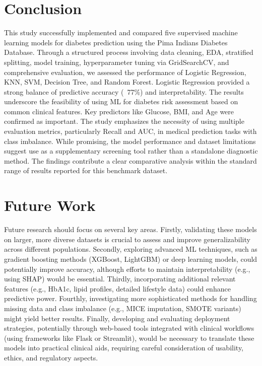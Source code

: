 \documentclass[conference]{IEEEtran}
\begin{document}
\section{Conclusion}
This study successfully implemented and compared five supervised machine learning models for diabetes prediction using the Pima Indians Diabetes Database. Through a structured process involving data cleaning, EDA, stratified splitting, model training, hyperparameter tuning via GridSearchCV, and comprehensive evaluation, we assessed the performance of Logistic Regression, KNN, SVM, Decision Tree, and Random Forest. Logistic Regression provided a strong balance of predictive accuracy (~77\%) and interpretability. The results underscore the feasibility of using ML for diabetes risk assessment based on common clinical features. Key predictors like Glucose, BMI, and Age were confirmed as important. The study emphasizes the necessity of using multiple evaluation metrics, particularly Recall and AUC, in medical prediction tasks with class imbalance. While promising, the model performance and dataset limitations suggest use as a supplementary screening tool rather than a standalone diagnostic method. The findings contribute a clear comparative analysis within the standard range of results reported for this benchmark dataset.

\section{Future Work}
Future research should focus on several key areas. Firstly, validating these models on larger, more diverse datasets is crucial to assess and improve generalizability across different populations. Secondly, exploring advanced ML techniques, such as gradient boosting methods (XGBoost, LightGBM) or deep learning models, could potentially improve accuracy, although efforts to maintain interpretability (e.g., using SHAP) would be essential. Thirdly, incorporating additional relevant features (e.g., HbA1c, lipid profiles, detailed lifestyle data) could enhance predictive power. Fourthly, investigating more sophisticated methods for handling missing data and class imbalance (e.g., MICE imputation, SMOTE variants) might yield better results. Finally, developing and evaluating deployment strategies, potentially through web-based tools integrated with clinical workflows (using frameworks like Flask or Streamlit), would be necessary to translate these models into practical clinical aids, requiring careful consideration of usability, ethics, and regulatory aspects.
\end{document}
